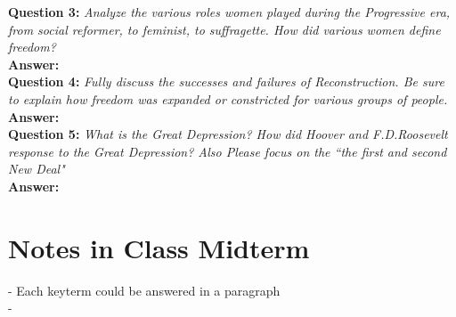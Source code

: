 \documentclass{article}
\begin{document}
\textbf{Question 3:} \textit{Analyze the various roles women played during the Progressive era, from
social reformer, to feminist, to suffragette. How did various women define freedom?}\\
\textbf{Answer:}       \\


\textbf{Question 4:} \textit{Fully discuss the successes and failures of Reconstruction. Be sure to explain how freedom was expanded or constricted for various groups of people.}\\
\textbf{Answer:}       \\



\textbf{Question 5:} \textit{What is the Great Depression? How did Hoover and F.D.Roosevelt response to the Great Depression? Also Please focus on the “the first and second New Deal"}\\
\textbf{Answer:}       \\


\section{Notes in Class Midterm}
- Each keyterm could be answered in a paragraph\\
- 
\end{document}
